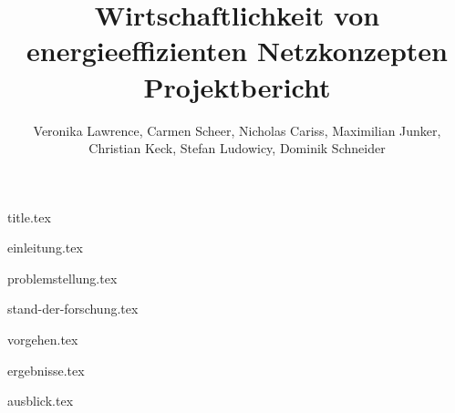 \documentclass[
  12pt,
  titlepage,
  parskip,
  draft=false,
  headsepline=true,
  footsepline=true,
  captions=tableheading
]{scrartcl}
\title{\huge{Wirtschaftlichkeit von energieeffizienten Netzkonzepten} \\ \large{Projektbericht}}
\author{Veronika Lawrence, Carmen Scheer, Nicholas Cariss, Maximilian Junker,\\ Christian Keck, Stefan Ludowicy, Dominik Schneider}
\begin{document}
{title.tex}


\newpage
\tableofcontents{}
\newpage
\listoffigures
\listoftables
\newpage


\pagestyle{headings}
{einleitung.tex}

{problemstellung.tex}

{stand-der-forschung.tex}

{vorgehen.tex}

{ergebnisse.tex}

{ausblick.tex}

\newpage
\printbibliography[heading=bibintoc]
\end{document}
